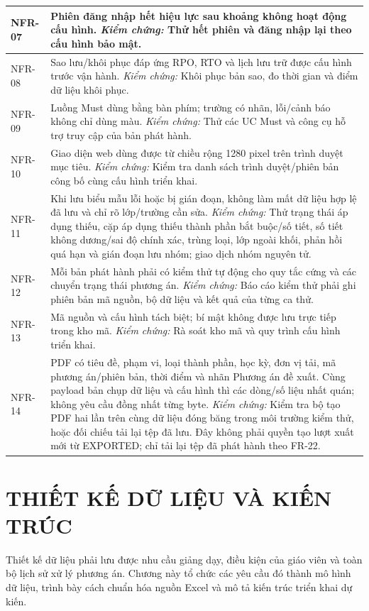 \documentclass[12pt,a4paper]{report}
\begin{document}
\begin{longtable}{|p{1.45cm}|p{12.5cm}|}
NFR-07 & Phiên đăng nhập hết hiệu lực sau khoảng không hoạt động cấu hình. \textit{Kiểm chứng:} Thử hết phiên và đăng nhập lại theo cấu hình bảo mật. \\\hline
NFR-08 & Sao lưu/khôi phục đáp ứng RPO, RTO và lịch lưu trữ được cấu hình trước vận hành. \textit{Kiểm chứng:} Khôi phục bản sao, đo thời gian và điểm dữ liệu khôi phục. \\\hline
NFR-09 & Luồng Must dùng bằng bàn phím; trường có nhãn, lỗi/cảnh báo không chỉ dùng màu. \textit{Kiểm chứng:} Thử các UC Must và công cụ hỗ trợ truy cập của bản phát hành. \\\hline
NFR-10 & Giao diện web dùng được từ chiều rộng 1280 pixel trên trình duyệt mục tiêu. \textit{Kiểm chứng:} Kiểm tra danh sách trình duyệt/phiên bản công bố cùng cấu hình triển khai. \\\hline
NFR-11 & Khi lưu biểu mẫu lỗi hoặc bị gián đoạn, không làm mất dữ liệu hợp lệ đã lưu và chỉ rõ lớp/trường cần sửa. \textit{Kiểm chứng:} Thử trạng thái áp dụng thiếu, cặp áp dụng thiếu thành phần bắt buộc/số tiết, số tiết không dương/sai độ chính xác, trùng loại, lớp ngoài khối, phản hồi quá hạn và gián đoạn lưu nhóm; giao dịch nhóm nguyên tử. \\\hline
NFR-12 & Mỗi bản phát hành phải có kiểm thử tự động cho quy tắc cứng và các chuyển trạng thái phương án. \textit{Kiểm chứng:} Báo cáo kiểm thử phải ghi phiên bản mã nguồn, bộ dữ liệu và kết quả của từng ca thử. \\\hline
NFR-13 & Mã nguồn và cấu hình tách biệt; bí mật không được lưu trực tiếp trong kho mã. \textit{Kiểm chứng:} Rà soát kho mã và quy trình cấu hình triển khai. \\\hline
NFR-14 & PDF có tiêu đề, phạm vi, loại thành phần, học kỳ, đơn vị tải, mã phương án/phiên bản, thời điểm và nhãn Phương án đề xuất. Cùng payload bản chụp dữ liệu và cấu hình thì các dòng/số liệu nhất quán; không yêu cầu đồng nhất từng byte. \textit{Kiểm chứng:} Kiểm tra bộ tạo PDF hai lần trên cùng dữ liệu đóng băng trong môi trường kiểm thử, hoặc đối chiếu tải lại tệp đã lưu. Đây không phải quyền tạo lượt xuất mới từ EXPORTED; chỉ tải lại tệp đã phát hành theo FR-22. \\\hline
\end{longtable}


\chapter{THIẾT KẾ DỮ LIỆU VÀ KIẾN TRÚC}\label{chap:data}
Thiết kế dữ liệu phải lưu được nhu cầu giảng dạy, điều kiện của giáo viên và toàn bộ lịch sử xử lý phương án. Chương này tổ chức các yêu cầu đó thành mô hình dữ liệu, trình bày cách chuẩn hóa nguồn Excel và mô tả kiến trúc triển khai dự kiến.
\end{document}
